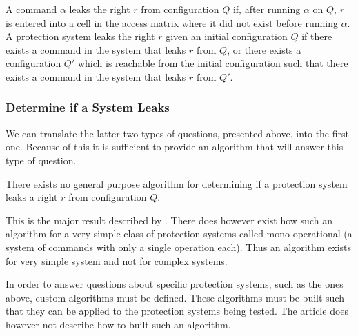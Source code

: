 \begin{definition}
A command $\alpha$ leaks the right $r$ from configuration $Q$ if, after running $\alpha$ on $Q$, $r$ is entered into a cell in the access matrix where it did not exist before running $\alpha$.
A protection system leaks the right $r$ given an initial configuration $Q$ if there exists a command in the system that leaks $r$ from $Q$, or there exists a configuration $Q'$ which is reachable from the initial configuration such that there exists a command in the system that leaks $r$ from $Q'$.
\end{definition}

\subsubsection{Determine if a System Leaks}
We can translate the latter two types of questions, presented above, into the first one.
Because of this it is sufficient to provide an algorithm that will answer this type of question.

\begin{definition}
  There exists no general purpose algorithm for determining if a protection system leaks a right $r$ from configuration $Q$. \Cite{HRU}
\end{definition}

This is the major result described by \citet{HRU}.
There does however exist how such an algorithm for a very simple class of protection systems called mono-operational (a system of commands with only a single operation each).
Thus an algorithm exists for very simple system and not for complex systems.

In order to answer questions about specific protection systems, such as the ones above, custom algorithms must be defined.
These algorithms must be built such that they can be applied to the protection systems being tested.
The article does however not describe how to built such an algorithm.
